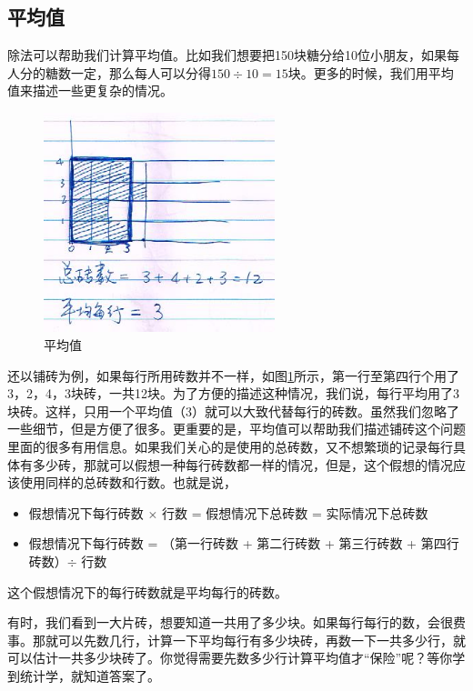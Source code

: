 \subsection{平均值} 
除法可以帮助我们计算平均值。比如我们想要把150块糖分给10位小朋友，如果每人分的糖数一定，那么每人可以分得$150\div10=15$块。更多的时候，我们用平均值来描述一些更复杂的情况。

\begin{figure}[h]
     \center
     \includegraphics[width=0.6\textwidth]{division_res/average}
     \caption{平均值}
     \label{img_average}
\end{figure}

还以铺砖为例，如果每行所用砖数并不一样，如图\ref{img_average}所示，第一行至第四行个用了3，2，4，3块砖，一共12块。为了方便的描述这种情况，我们说，每行平均用了3块砖。这样，只用一个平均值（3）就可以大致代替每行的砖数。虽然我们忽略了一些细节，但是方便了很多。更重要的是，平均值可以帮助我们描述铺砖这个问题里面的很多有用信息。如果我们关心的是使用的总砖数，又不想繁琐的记录每行具体有多少砖，那就可以假想一种每行砖数都一样的情况，但是，这个假想的情况应该使用同样的总砖数和行数。也就是说，
\begin{itemize}
    \item 假想情况下每行砖数 $\times$ 行数 = 假想情况下总砖数 = 实际情况下总砖数
    \item 假想情况下每行砖数 = （第一行砖数 + 第二行砖数 + 第三行砖数 + 第四行砖数）$\div$ 行数
\end{itemize}


这个假想情况下的每行砖数就是平均每行的砖数。

有时，我们看到一大片砖，想要知道一共用了多少块。如果每行每行的数，会很费事。那就可以先数几行，计算一下平均每行有多少块砖，再数一下一共多少行，就可以估计一共多少块砖了。你觉得需要先数多少行计算平均值才“保险”呢？等你学到统计学，就知道答案了。

